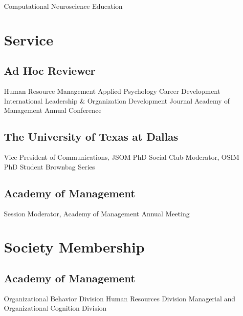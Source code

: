 \begin{entries}
    Computational Neuroscience Education
\end{entries}
\fi


\section*{Service}

\subsection*{Ad Hoc Reviewer}

\begin{entries}
    \entn{}Human Resource Management
    \entn{}Applied Psychology
    \entn{}Career Development International
    \entn{}Leadership \& Organization Development Journal
    \entn{}Academy of Management Annual Conference
\end{entries}

\subsection*{The University of Texas at Dallas}

\begin{entries}
    Vice President of Communications, JSOM PhD Social Club
    Moderator, OSIM PhD Student Brownbag Series
\end{entries}

\subsection*{Academy of Management}

\begin{entries}
    Session Moderator, Academy of Management Annual Meeting
\end{entries}


\section*{Society Membership}

\ifcvmedium
\subsection*{Academy of Management}

\begin{entries}
    \entn{}Organizational Behavior Division
    \entn{}Human Resources Division
    \entn{}Managerial and Organizational Cognition Division
\end{entries}

